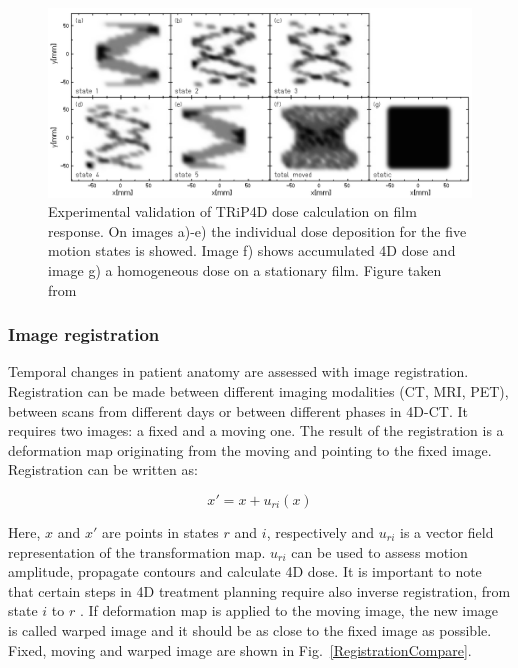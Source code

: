 \begin{figure}[H]
\begin{center}
\includegraphics[scale=0.35]{./Fundamentals/Images/4DtreatmentPlanning.png}
\caption{Experimental validation of TRiP4D dose calculation on film response. On images a)-e) the individual dose deposition for the five motion states is showed.
Image f) shows accumulated 4D dose and image g) a homogeneous dose on a stationary film. Figure taken from \cite{Richter2012}}
\label{TRiP4Ddose}
\end{center}
\end{figure}

\subsubsection{Image registration}
\label{sec:registration}


Temporal changes in patient anatomy are assessed with image registration. Registration can be made between different imaging modalities (CT, MRI, PET), between scans from different days or between
different phases in 4D-CT. It requires two images: a fixed and a moving one. The result of the registration is a deformation map originating from the moving and pointing to the fixed image. Registration can be written as:


\begin{equation}
\label{df}
x' = x + u_{ri}(x)
\end{equation} 

Here, $x$ and $x'$ are points in states $r$ and $i$, respectively and $u_{ri}$ is a vector field representation of the transformation map. $u_{ri}$ can be used to assess motion amplitude, propagate contours and calculate 4D dose.
It is important to note that certain steps in 4D treatment planning require also inverse registration, from state $i$ to $r$ \cite{Richter2012}. If deformation map is applied to the moving image, 
the new image is called warped image and it should be as close to the fixed image as possible. Fixed, moving and warped image are shown in Fig.~\ref{RegistrationCompare}. 

